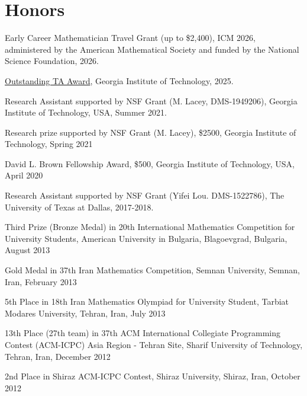 \documentclass[11pt]{article}
\newenvironment{innerlist}[1][\enskip\textbullet]
        {\begin{compactitem}[#1]}{\end{compactitem}}
\begin{document}
\section{Honors}
\vspace{2 mm}
\begin{compactitem}
\item Early Career Mathematician Travel Grant (up to \$2,400), ICM 2026, administered by the American Mathematical Society and funded by the National Science Foundation, 2026.
\item \href{https://math.gatech.edu/graduate/graduate-student-awards-and-honors}{Outstanding TA Award}, Georgia Institute of Technology, 2025.
\item Research Assistant supported by NSF Grant (M. Lacey, DMS-1949206), Georgia Institute of Technology,
USA, Summer 2021.
\item Research prize supported by NSF Grant (M. Lacey), \$2500, Georgia Institute of Technology, Spring 2021
\item{David L. Brown Fellowship Award, \$500, Georgia Institute of Technology, USA, April 2020}
\item Research Assistant supported by NSF Grant (Yifei Lou. DMS-1522786), The University of Texas at Dallas, 2017-2018.
\item{Third Prize (Bronze Medal) in 20th International Mathematics Competition for University Students, American University in Bulgaria, Blagoevgrad, Bulgaria, August 2013}

\item{Gold Medal in 37th Iran Mathematics Competition, Semnan University, Semnan, Iran, February 2013}

\item{5th Place in 18th Iran Mathematics Olympiad for University Student, Tarbiat Modares University, Tehran, Iran, July 2013}

\item {13th Place (27th team) in 37th ACM International Collegiate Programming Contest \newline
(ACM-ICPC) Asia Region - Tehran Site, Sharif University of Technology, Tehran, Iran, December 2012}

\item {2nd Place in Shiraz ACM-ICPC Contest, Shiraz University, Shiraz, Iran, October 2012}

\end{compactitem}
\end{document}
